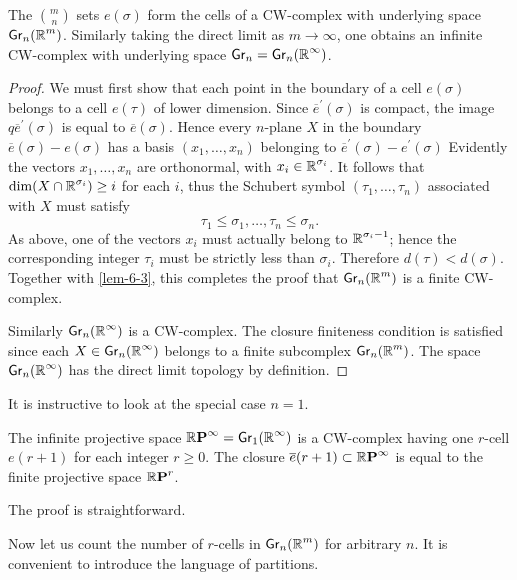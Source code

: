 \begin{theorem}\label{thm-6-4}
	The $\binom{m}{n}$ sets $e(\sigma)$ form the cells of a CW-complex with underlying space $\grass{n}{m}$. Similarly taking the direct limit as $m \rightarrow \infty$, one obtains an infinite CW-complex with underlying space $\grass{n}{}=\grass{n}{\infty}$.
\end{theorem}
\begin{proof}
	We must first show that each point in the boundary of a cell $e(\sigma)$ belongs to a cell $e(\tau)$ of lower dimension. Since $\overline{e}^{\prime}(\sigma)$ is compact, the image $q \overline{e}^{\prime}(\sigma)$ is equal to $\overline{e}(\sigma)$. Hence every $n$-plane $X$ in the boundary $\overline{e}(\sigma)-e(\sigma)$ has a basis $(x_{1},\dots, x_{n})$ belonging to $\overline{e}^{\prime}(\sigma)-e^{\prime}(\sigma)$ Evidently the vectors $x_{1},\dots, x_{n}$ are orthonormal, with $x_{i} \in \boldsymbol{\mathbb{R}}^{\sigma_{i}}$. It follows that $\dim(X \cap \boldsymbol{\mathbb{R}}^{\sigma_{i}}) \geq i$ for each $i$, thus the Schubert symbol $(\tau_{1},\dots, \tau_{n})$ associated with $X$ must satisfy
	\[
	\tau_{1} \leq \sigma_{1},\dots, \tau_{n} \leq \sigma_{n}.
	\]
	As above, one of the vectors $x_{i}$ must actually belong to $\boldsymbol{\mathbb{R}}^{\sigma_{i}-1} $; hence the corresponding integer $\tau_{i}$ must be strictly less than $\sigma_{i}$. Therefore $d(\tau)<d(\sigma)$. Together with \cref{lem-6-3}, this completes the proof that $\grass{n}{m}$ is a finite CW-complex.
	
	Similarly $\grass{n}{\infty}$ is a CW-complex. The closure finiteness condition is satisfied since each $X \in \grass{n}{\infty}$ belongs to a finite subcomplex $\grass{n}{m}$. The space $\grass{n}{\infty}$ has the direct limit topology by definition.
\end{proof} 

It is instructive to look at the special case $n=1$. \begin{corollary}\label{cor-6-5}
The infinite projective space $\rp{\infty}=\grass{1}{\infty}$ is a CW-complex having one $r$-cell $e(r+1)$ for each integer $r \geq 0$. The closure $\overline{e}(r+1) \subset \boldsymbol{\mathbb{R}}\boldsymbol{\mathrm{P}}^{\infty}$ is equal to the finite projective space $\boldsymbol{\mathbb{R}}\boldsymbol{\mathrm{P}}^{r}$.	
\end{corollary}
The proof is straightforward.

Now let us count the number of $r$-cells in $\grass{n}{m}$ for arbitrary $n $. It is convenient to introduce the language of partitions.

